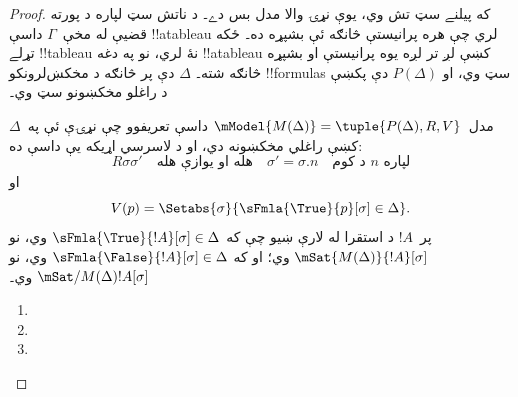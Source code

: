 \documentclass[../../../include/open-logic-section]{subfiles}
\begin{document}
\begin{proof}
که پيلنے سټ تش وي، يوې نړۍ والا مدل بس دے۔ د ناتش سټ لپاره
د پورته قضيې له مخې~$\Gamma$ داسې !!a{tableau} لري چې هره
پرانيستې څانګه ئې بشپړه ده۔ ځکه تړلے !!{tableau} نۀ لري، نو په دغه
!!a{tableau} کښې لږ تر لږه يوه پرانيستې او بشپړه څانګه شته۔
$\Delta$ دې پر څانګه د مخکښ‌لرونکو !!{formula}s سټ وي، او
$P(\Delta)$ دې پکښې د راغلو مخکښونو سټ وي۔

مدل~$\mModel{M(\Delta)} = \tuple{P(\Delta), R, V}$ داسې تعريفوو
چې نړۍې ئې په~$\Delta$ کښې راغلي مخکښونه دي، او د لاسرسي
اړيکه يې داسې ده:
\[
R\sigma\sigma' \quad \text{هله او يوازې هله} \quad
\sigma'=\sigma.n \quad \text{د کوم~$n$ لپاره}
\]
او
\[
V(p) = \Setabs{\sigma}{\sFmla{\True}{p}[\sigma] \in \Delta}.
\]
پر~$!A$ د استقرا له لارې ښيو چې که
$\sFmla{\True}{!A}[\sigma] \in \Delta$ وي، نو
$\mSat{M(\Delta)}{!A}[\sigma]$ وي؛ او که
$\sFmla{\False}{!A}[\sigma] \in \Delta$ وي، نو
$\mSat/{M(\Delta)}{!A}[\sigma]$ وي۔

\begin{enumerate}
  \item {}
  \item {}
  \item {}
\end{enumerate}
\end{proof}
\end{document}
